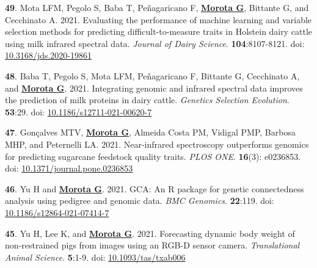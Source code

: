 \documentclass[margin,line,10pt]{res}
\newenvironment{list1}{
  \begin{list}{\ding{113}}{%
      \setlength{\itemsep}{0in}
      \setlength{\parsep}{0in} \setlength{\parskip}{0in}
      \setlength{\topsep}{0in} \setlength{\partopsep}{0in} 
      \setlength{\leftmargin}{0.17in}}}{\end{list}}
\begin{document}
\begin{resume}
\begin{list1}
\item [{\bf 49}.] Mota LFM, Pegolo S, Baba T, Pe\~{n}agaricano F, \textbf{\underline{Morota G}}, Bittante G, and Cecchinato A. 2021. Evaluating the performance of machine learning and variable selection methods for predicting difficult-to-measure traits in Holstein dairy cattle using milk infrared spectral data. \emph{Journal of Dairy Science}. \textbf{104}:8107-8121. doi: \textcolor{blue}{\href{https://doi.org/10.3168/jds.2020-19861}{10.3168/jds.2020-19861}}

    \vspace{0.5cm}

\item [{\bf 48}.] Baba T, Pegolo S, Mota LFM, Pe\~{n}agaricano F, Bittante G, Cecchinato A, and \textbf{\underline{Morota G}}. 2021. Integrating genomic and infrared spectral data improves the prediction of milk proteins in dairy cattle. \emph{Genetics Selection Evolution}. \textbf{53}:29. doi: \textcolor{blue}{\href{https://doi.org/10.1186/s12711-021-00620-7}{10.1186/s12711-021-00620-7}}
  
  \vspace{0.5cm}
  
\item [{\bf 47}.] Gon\c{c}alves MTV, \textbf{\underline{Morota G}}, Almeida Costa PM, Vidigal PMP, Barbosa MHP, and Peternelli LA. 2021. Near-infrared spectroscopy outperforms genomics for predicting sugarcane feedstock quality traits.  \emph{PLOS ONE}. \textbf{16}(3): e0236853. doi: \textcolor{blue}{\href{https://doi.org/10.1371/journal.pone.0236853}{10.1371/journal.pone.0236853}}

  \vspace{0.5cm}

  \item  [{\bf 46}.] Yu H and \textbf{\underline{Morota G}}. 2021. GCA: An R package for genetic connectedness analysis using pedigree and genomic data. \emph{BMC Genomics}. \textbf{22}:119.  doi: \textcolor{blue}{\href{https://doi.org/10.1186/s12864-021-07414-7}{10.1186/s12864-021-07414-7}}

  \vspace{0.5cm}

  
\item [{\bf 45}.] Yu H, Lee K, and \textbf{\underline{Morota G}}. 2021. Forecasting dynamic body weight of non-restrained pigs from images using an RGB-D sensor camera. \emph{Translational Animal Science}. \textbf{5}:1-9. doi: \textcolor{blue}{\href{https://doi.org/10.1093/tas/txab006}{10.1093/tas/txab006}} 


\end{list1}
\end{resume}
\end{document}
